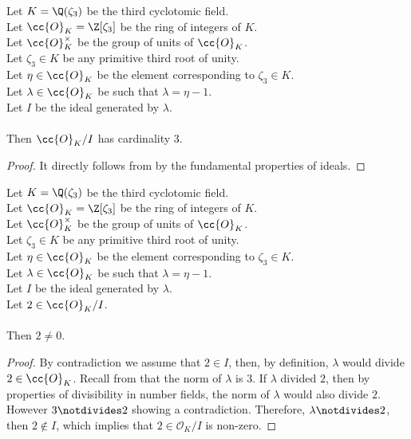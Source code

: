 \begin{lemma}
    \label{lmm:card_quot}
    \leanok
    Let $K = \Q(\zeta_3)$ be the third cyclotomic field. \\
    Let $\cc{O}_K = \Z[\zeta_3]$ be the ring of integers of $K$. \\
    Let $\cc{O}^\times_K$ be the group of units of $\cc{O}_K$. \\
    Let $\zeta_3 \in K$ be any primitive third root of unity. \\
    Let $\eta \in \cc{O}_K$ be the element corresponding to $\zeta_3 \in K$. \\
    Let $\lambda \in \cc{O}_K$ be such that $\lambda = \eta -1$. \\
    Let $I$ be the ideal generated by $\lambda$. \\\\
    Then $\cc{O}_K / I$ has cardinality $3$.
\end{lemma}
\begin{proof}
    \leanok
    It directly follows from  by the fundamental properties of ideals.
\end{proof}

\begin{lemma}
    \label{lmm:two_ne_zero}
    \leanok
    Let $K = \Q(\zeta_3)$ be the third cyclotomic field. \\
    Let $\cc{O}_K = \Z[\zeta_3]$ be the ring of integers of $K$. \\
    Let $\cc{O}^\times_K$ be the group of units of $\cc{O}_K$. \\
    Let $\zeta_3 \in K$ be any primitive third root of unity. \\
    Let $\eta \in \cc{O}_K$ be the element corresponding to $\zeta_3 \in K$. \\
    Let $\lambda \in \cc{O}_K$ be such that $\lambda = \eta -1$. \\
    Let $I$ be the ideal generated by $\lambda$. \\
    Let $2 \in \cc{O}_K / I$. \\\\
    Then $2 \neq 0$.
\end{lemma}
\begin{proof}
    \leanok
    By contradiction we assume that $2 \in I$, then, by definition,
    $\lambda$ would divide $2 \in \cc{O}_K$.
    Recall from  that the norm of $\lambda$ is $3$.
    If $\lambda$ divided $2$, then by properties of divisibility in number fields,
    the norm of $\lambda$ would also divide $2$.
    However $3 \notdivides 2$ showing a contradiction.
    Therefore, $\lambda \notdivides 2$, then $2 \notin I$, which implies
    that $2 \in \mathcal{O}_K / I$ is non-zero.
\end{proof}

